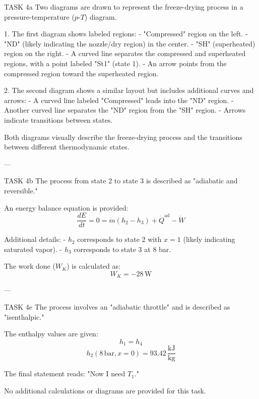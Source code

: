TASK 4a  
Two diagrams are drawn to represent the freeze-drying process in a pressure-temperature (\(p\)-\(T\)) diagram.  

1. The first diagram shows labeled regions:  
   - "Compressed" region on the left.  
   - "ND" (likely indicating the nozzle/dry region) in the center.  
   - "SH" (superheated) region on the right.  
   - A curved line separates the compressed and superheated regions, with a point labeled "St1" (state 1).  
   - An arrow points from the compressed region toward the superheated region.  

2. The second diagram shows a similar layout but includes additional curves and arrows:  
   - A curved line labeled "Compressed" leads into the "ND" region.  
   - Another curved line separates the "ND" region from the "SH" region.  
   - Arrows indicate transitions between states.  

Both diagrams visually describe the freeze-drying process and the transitions between different thermodynamic states.  

---

TASK 4b  
The process from state 2 to state 3 is described as "adiabatic and reversible."  

An energy balance equation is provided:  
\[
\frac{dE}{dt} = 0 = \dot{m} (h_2 - h_3) + \dot{Q}^{\text{ad}} - \dot{W}
\]  

Additional details:  
- \( h_2 \) corresponds to state 2 with \( x = 1 \) (likely indicating saturated vapor).  
- \( h_3 \) corresponds to state 3 at 8 bar.  

The work done (\( W_K \)) is calculated as:  
\[
W_K = -28 \, \text{W}
\]  

---

TASK 4e  
The process involves an "adiabatic throttle" and is described as "isenthalpic."  

The enthalpy values are given:  
\[
h_1 = h_4
\]  
\[
h_2 (8 \, \text{bar}, x = 0) = 93.42 \, \frac{\text{kJ}}{\text{kg}}
\]  

The final statement reads:  
"Now I need \( T_1 \)."  

No additional calculations or diagrams are provided for this task.